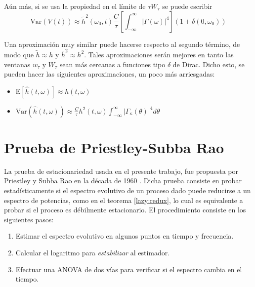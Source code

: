 \documentclass[12pt,letterpaper]{book}
\newcommand{\intR}{\int_{-\infty}^{\infty}}
\newcommand{\dirac}{$\delta$  de Dirac}
\newcommand{\est}[1]{\widehat{ #1 }}
\newcommand{\E}[1]{\mathrm{E}\left[ #1 \right]}
\newcommand{\Var}[1]{\mathrm{Var}\left( #1 \right)}
\newcommand{\abso}[1]{\left| #1 \right|}
\begin{document}
Aún más, si se usa la propiedad en el límite de $\tau W_\tau$ se puede escribir
\begin{equation}
\Var{V(t)} \approx 
\widetilde{h}^{2}(\omega_0,t) \frac{C}{\tau} \left[ \intR \abso{\Gamma(\omega)}^{4} \right] (1+\delta(0,\omega_0))
\end{equation}

Una aproximación muy similar puede hacerse respecto al segundo término, de modo que $\widetilde{h}\approx h$ y $\overline{h}^{2}\approx h^{2}$.
%
Tales aproximaciones serán mejores en tanto las ventanas $w_{\tau}$ y $W_{\tau}$ sean más cercanas a funciones tipo \dirac.
%
Dicho esto, se pueden hacer las siguientes aproximaciones, un poco más arriesgadas:
\begin{itemize}
\item $\displaystyle \E{\est{h}(t,\omega)} \approx h(t,\omega)$
\item $\displaystyle \Var{\est{h}(t,\omega)} \approx 
\frac{C}{\tau} h^{2}(t,\omega) \intR \abso{\Gamma_\kappa (\theta)}^{4} d\theta$
\end{itemize}


\section{Prueba de Priestley-Subba Rao}
\label{sec:psr}

La prueba de estacionariedad usada en el presente trabajo, fue propuesta por Priestley y Subba Rao en la década de 1960 \cite{Priestley69}.
%
Dicha prueba consiste en probar estadísticamente si el espectro evolutivo de un proceso dado puede reducirse a un espectro de potencias, como en el teorema \ref{lazy:redux}, lo cual es equivalente a probar si el proceso es débilmente estacionario.
%
El procedimiento consiste en los siguientes pasos:
\begin{enumerate}
\item Estimar el espectro evolutivo en algunos puntos en tiempo y frecuencia.
\item Calcular el logaritmo para \textit{estabilizar} al estimador.
\item Efectuar una ANOVA de dos vías para verificar si el espectro cambia en el tiempo.
\end{enumerate}
\end{document}
